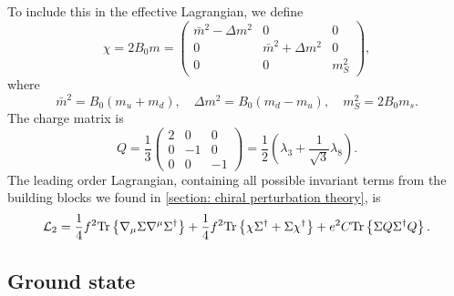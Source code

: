 %
To include this in the effective Lagrangian, we define
%
\begin{equation}
    \chi = 2B_0 m = 
    \begin{pmatrix}
        \bar m^2 - \Delta m^2 & 0 &0\\
        0& \bar m^2 + \Delta m^2 & 0 \\
        0&0&m_S^2
    \end{pmatrix},
\end{equation}
%
where
%
\begin{equation}
    \bar m^2 =  B_0(m_u + m_d),\quad 
    \Delta m^2 = B_0(m_d - m_u), \quad
    m_S^2 = 2B_0 m_s.
\end{equation}
%
The charge matrix is
%
\begin{equation}
    \label{three-flavor charge matrix}
    Q = \frac{1}{3}
    \begin{pmatrix}
        2 & 0 & 0\\
        0 & -1 & 0\\
        0 & 0 & -1
    \end{pmatrix}
    = \frac{1}{2} \left( \lambda_3 + \frac{1}{\sqrt{3}} \lambda_8 \right).
\end{equation}
%
The leading order Lagrangian, containing all possible invariant terms from the building blocks we found in \autoref{section: chiral perturbation theory}, is~\autocite{eckerRoleResonancesChiral1989,gasserChiralPerturbationTheory1984,gasserChiralPerturbationTheory1985,schererIntroductionChiralPerturbation2002}
%
\begin{equation}
    \label{leading order three-flavor lagrangian}
    \mathcal{L}_2 
    = \frac{1}{4}f^2 \text{Tr} \left\{ \nabla_\mu \Sigma \nabla^\mu \Sigma^\dagger \right\}
    + \frac{1}{4}f^2 \text{Tr} \left\{ \chi \Sigma^\dagger + \Sigma \chi^\dagger \right\}
    + e^2 C \text{Tr} \left\{ \Sigma Q \Sigma^\dagger Q \right\}.
\end{equation}
%


\subsection{Ground state}


